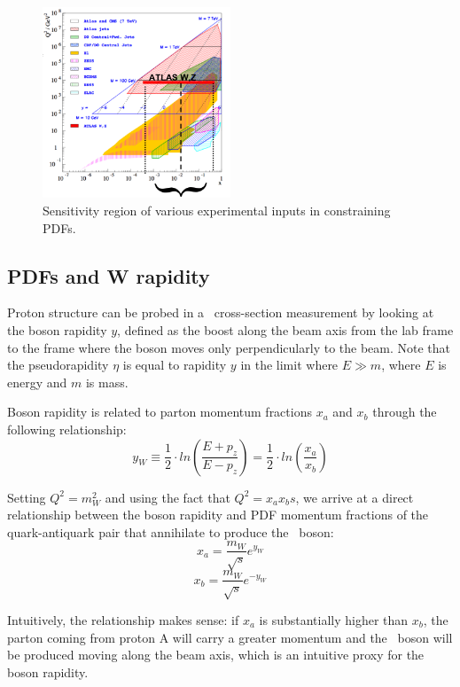 \begin{figure}[phtb]
  \begin{center}
    \includegraphics[width=0.5\textwidth]{theory/fig/atlas_xq}
    \caption{ Sensitivity region of various experimental inputs in constraining PDFs.}
    \label{fig:theory:atlas_xq}
 \end{center}
\end{figure}

\subsection{ PDFs and W rapidity }
\label{sec:theory:pdfrap}
Proton structure can be probed in a \Wboson\ cross-section measurement by looking at the boson rapidity $y$, defined as the boost along the beam axis from the lab frame to the frame where the boson moves only perpendicularly to the beam. Note that the pseudorapidity $\eta$ is equal to rapidity $y$ in the limit where $E \gg m$, where $E$ is energy and $m$ is mass.

Boson rapidity is related to parton momentum fractions $x_a$ and $x_b$ through the following relationship:
\begin{equation}
y_W \equiv \frac{1}{2} \cdot ln \left( \frac{E + p_z}{E - p_z} \right) = \frac{1}{2} \cdot ln \left( \frac{x_a}{x_b}\right)
\label{theory:rapidity}
\end{equation}

Setting $Q^2 = m_W^2$ and using the fact that $Q^2 = x_{a}x_{b}s$, we arrive at a direct relationship between the boson rapidity and PDF momentum fractions of the quark-antiquark pair that annihilate to produce the \Wboson\ boson:
$$ x_a = \frac{m_W}{\sqrt s} e^{y_W} $$
$$ x_b = \frac{m_W}{\sqrt s} e^{-y_W} $$

Intuitively, the relationship makes sense: if $x_a$ is substantially higher than $x_b$, the parton coming from proton A will carry a greater momentum and the \Wboson\ boson will be produced moving along the beam axis, which is an intuitive proxy for the boson rapidity.

